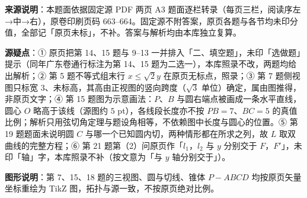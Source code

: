 


\begin{gktip}
\textbf{来源说明}：本题面依据固定源 PDF 两页 A3 题面逐栏转录（每页三栏，阅读序左→中→右），原卷印刷页码 663–664。固定源不附答案，原页各题与各节均未印分值，全部记「原页未标」，不补。答案与解析均由本库独立复算。

\textbf{源疑点}：① 原页把第 14、15 题与 9–13 一并排入「二、填空题」，未印「选做题」提示（同年广东卷通行标注为第 14、15 题为二选一），本库照录不改，两题均给出解析；② 第 5 题不等式组末行 $x\leqslant\sqrt2y$ 在原页无标点，照录；③ 第 7 题侧视图只标宽 $3$、未标高，其高由正视图的竖向跨度（$\sqrt3$ 单位）确定，属由图推得，非原页文字；④ 第 15 题图为示意画法：$P$、$B$ 与圆右端点被画成一条水平直线，圆心 $O$ 略高于该线（源图约 $5$ pt），各线段长度亦不按 $PB=7$、$BC=5$ 的真值比例；解析只用弦切角定理与题设角相等，不依赖图中长度与圆心的位置。⑤ 第 19 题题面未说明圆 $C$ 与哪一个已知圆内切，两种情形都在所求之列，故 $L$ 取双曲线的完整方程；⑥ 第 21 题第（2）问原页作「$l_1$，$l_2$ 与 $y$ 分别交于 $F$，$F'$」，未印「轴」字，本库照录不补（按文意为「与 $y$ 轴分别交于」）。

\textbf{图形说明}：第 7、15、18 题的三视图、圆与切线、锥体 $P-ABCD$ 均按原页矢量坐标重绘为 TikZ 图，拓扑与源一致，不按原页绝对比例。
\end{gktip}


